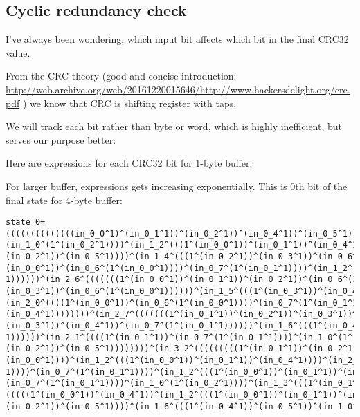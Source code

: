 

\subsection{Cyclic redundancy check}

I've always been wondering, which input bit affects which bit in the final CRC32 value.

From the \ac{CRC} theory (good and concise introduction:
\url{http://web.archive.org/web/20161220015646/http://www.hackersdelight.org/crc.pdf}
) we know that \ac{CRC} is shifting register with taps.

We will track each bit rather than byte or word, which is highly inefficient, but serves our purpose better:



Here are expressions for each CRC32 bit for 1-byte buffer:



For larger buffer, expressions gets increasing exponentially.
This is 0th bit of the final state for 4-byte buffer:

\begin{lstlisting}
state 0=((((((((((((((in_0_0^1)^(in_0_1^1))^(in_0_2^1))^(in_0_4^1))^(in_0_5^1))^(in_0_7^(1^(in_0_1^1))))^
(in_1_0^(1^(in_0_2^1))))^(in_1_2^(((1^(in_0_0^1))^(in_0_1^1))^(in_0_4^1))))^(in_1_3^(((1^(in_0_1^1))^
(in_0_2^1))^(in_0_5^1))))^(in_1_4^(((1^(in_0_2^1))^(in_0_3^1))^(in_0_6^(1^(in_0_0^1))))))^(in_2_0^((((1^
(in_0_0^1))^(in_0_6^(1^(in_0_0^1))))^(in_0_7^(1^(in_0_1^1))))^(in_1_2^(((1^(in_0_0^1))^(in_0_1^1))^(in_0_4^
1))))))^(in_2_6^(((((((1^(in_0_0^1))^(in_0_1^1))^(in_0_2^1))^(in_0_6^(1^(in_0_0^1))))^(in_1_4^(((1^(in_0_2^1))^
(in_0_3^1))^(in_0_6^(1^(in_0_0^1))))))^(in_1_5^(((1^(in_0_3^1))^(in_0_4^1))^(in_0_7^(1^(in_0_1^1))))))^
(in_2_0^((((1^(in_0_0^1))^(in_0_6^(1^(in_0_0^1))))^(in_0_7^(1^(in_0_1^1))))^(in_1_2^(((1^(in_0_0^1))^(in_0_1^1))^
(in_0_4^1))))))))^(in_2_7^(((((((1^(in_0_1^1))^(in_0_2^1))^(in_0_3^1))^(in_0_7^(1^(in_0_1^1))))^(in_1_5^(((1^
(in_0_3^1))^(in_0_4^1))^(in_0_7^(1^(in_0_1^1))))))^(in_1_6^(((1^(in_0_4^1))^(in_0_5^1))^(in_1_0^(1^(in_0_2^
1))))))^(in_2_1^((((1^(in_0_1^1))^(in_0_7^(1^(in_0_1^1))))^(in_1_0^(1^(in_0_2^1))))^(in_1_3^(((1^(in_0_1^1))^
(in_0_2^1))^(in_0_5^1))))))))^(in_3_2^(((((((((1^(in_0_1^1))^(in_0_2^1))^(in_0_4^1))^(in_0_5^1))^(in_0_6^(1^
(in_0_0^1))))^(in_1_2^(((1^(in_0_0^1))^(in_0_1^1))^(in_0_4^1))))^(in_2_0^((((1^(in_0_0^1))^(in_0_6^(1^(in_0_0^
1))))^(in_0_7^(1^(in_0_1^1))))^(in_1_2^(((1^(in_0_0^1))^(in_0_1^1))^(in_0_4^1))))))^(in_2_1^((((1^(in_0_1^1))^
(in_0_7^(1^(in_0_1^1))))^(in_1_0^(1^(in_0_2^1))))^(in_1_3^(((1^(in_0_1^1))^(in_0_2^1))^(in_0_5^1))))))^(in_2_4^
(((((1^(in_0_0^1))^(in_0_4^1))^(in_1_2^(((1^(in_0_0^1))^(in_0_1^1))^(in_0_4^1))))^(in_1_3^(((1^(in_0_1^1))^
(in_0_2^1))^(in_0_5^1))))^(in_1_6^(((1^(in_0_4^1))^(in_0_5^1))^(in_1_0^(1^(in_0_2^1))))))))))
\end{lstlisting}

